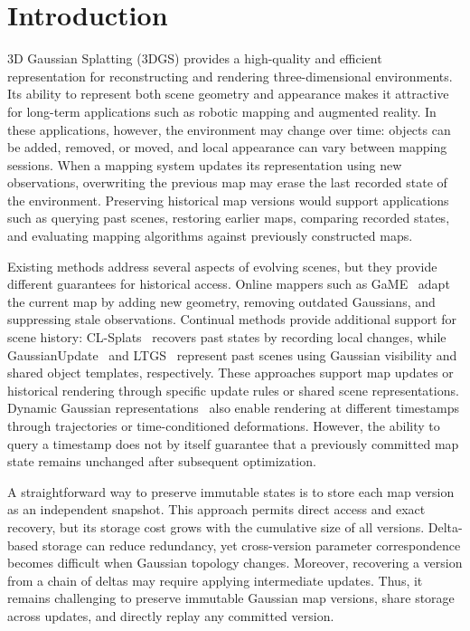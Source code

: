 \section{Introduction}

3D Gaussian Splatting (3DGS) provides a high-quality and efficient
representation for reconstructing and rendering three-dimensional
environments. Its ability to represent both scene geometry and
appearance makes it attractive for long-term applications such as
robotic mapping and augmented reality. In these applications, however,
the environment may change over time: objects can be added, removed,
or moved, and local appearance can vary between mapping sessions.
When a mapping system updates its representation using new
observations, overwriting the previous map may erase the last recorded
state of the environment. Preserving historical map versions would
support applications such as querying past scenes, restoring earlier
maps, comparing recorded states, and evaluating mapping algorithms
against previously constructed maps.

Existing methods address several aspects of evolving scenes, but
they provide different guarantees for historical access. Online
mappers such as GaME~\cite{yugay2026game} adapt the current map by
adding new geometry, removing outdated Gaussians, and suppressing
stale observations. Continual methods provide additional support for
scene history: CL-Splats~\cite{ackermann2025clsplats} recovers past
states by recording local changes, while
GaussianUpdate~\cite{zeng2025gaussianupdate} and
LTGS~\cite{kim2026ltgs} represent past scenes using Gaussian visibility
and shared object templates, respectively. These approaches support
map updates or historical rendering through specific update rules or
shared scene representations. Dynamic Gaussian
representations~\cite{luiten2024dynamic,wu2024gaussians} also enable
rendering at different timestamps through trajectories or
time-conditioned deformations. However, the ability to query a
timestamp does not by itself guarantee that a previously committed
map state remains unchanged after subsequent optimization.

A straightforward way to preserve immutable states is to store each
map version as an independent snapshot. This approach permits direct
access and exact recovery, but its storage cost grows with the
cumulative size of all versions. Delta-based storage can reduce
redundancy, yet cross-version parameter correspondence becomes
difficult when Gaussian topology changes. Moreover, recovering a
version from a chain of deltas may require applying intermediate
updates. Thus, it remains challenging to preserve immutable Gaussian
map versions, share storage across updates, and directly replay any
committed version.

